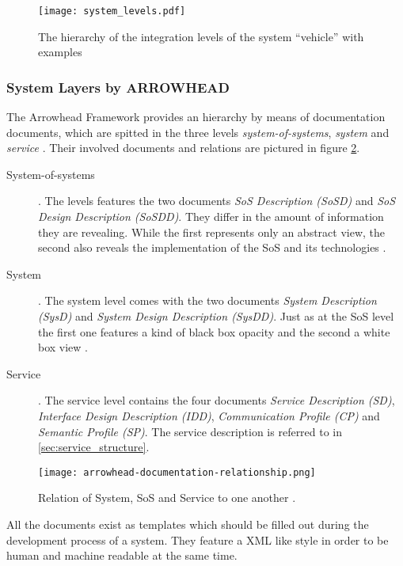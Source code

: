 \begin{figure}[ht]
\centering
\texttt{[image: system\_levels.pdf]}
\caption{The hierarchy of the integration levels of the system ``vehicle'' with examples}
\label{fig:integration_levels}
\end{figure}

\subsubsection{System Layers by ARROWHEAD}

The Arrowhead Framework provides an hierarchy by means of documentation documents, which are spitted in the three levels \emph{system-of-systems}, \emph{system} and \emph{service} \cite{arrowhead_inpr}. Their involved documents and relations are pictured in figure \ref{fig:sys-arrowhead}.

\begin{description}
\item [System-of-systems]. The levels features the two documents \emph{SoS Description (SoSD)} and \emph{SoS Design Description (SoSDD)}. They differ in the amount of information they are revealing. While the first represents only an abstract view, the second also reveals the implementation of the SoS and its technologies \cite{arrowhead_inpr}.
\item [System]. The system level comes with the two documents \emph{System Description (SysD)} and \emph{System Design Description (SysDD)}. Just as at the SoS level the first one features a kind of black box opacity and the second a white box view \cite{arrowhead_inpr}.
\item [Service]. The service level contains the four documents \emph{Service Description (SD)}, \emph{Interface Design Description (IDD)}, \emph{Communication Profile (CP)} and \emph{Semantic Profile (SP)}. The service description is referred to in \ref{sec:service_structure}.
\end{description}

\begin{figure}[ht]
\centering
\texttt{[image: arrowhead-documentation-relationship.png]}
\caption{Relation of System, SoS and Service to one another \cite{arrowhead:presentation}.}
\label{fig:sys-arrowhead}
\end{figure}

All the documents exist as templates which should be filled out during the development process of a system. They feature a XML like style in order to be human and machine readable at the same time.

